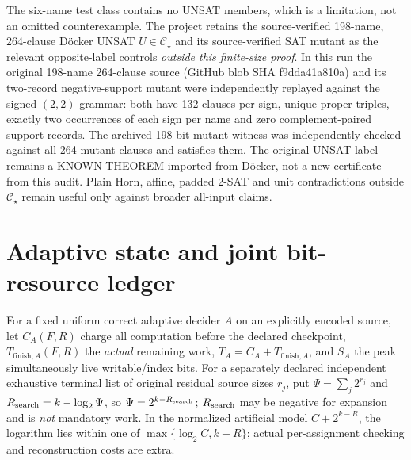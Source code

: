 \documentclass[11pt]{article}
\newcommand{\CS}{\mathcal C_\star}
\begin{document}
The six-name test class contains no UNSAT members, which is a limitation, not an omitted counterexample. The project retains the source-verified 198-name, 264-clause D\"ocker UNSAT $U\in\CS$ and its source-verified SAT mutant as the relevant opposite-label controls \emph{outside this finite-size proof}. In this run the original 198-name 264-clause source (GitHub blob SHA f9dda41a810a) and its two-record negative-support mutant were independently replayed against the signed $(2,2)$ grammar: both have 132 clauses per sign, unique proper triples, exactly two occurrences of each sign per name and zero complement-paired support records. The archived 198-bit mutant witness was independently checked against all 264 mutant clauses and satisfies them. The original UNSAT label remains a KNOWN THEOREM imported from D\"ocker, not a new certificate from this audit. Plain Horn, affine, padded 2-SAT and unit contradictions outside $\CS$ remain useful only against broader all-input claims.

\section{Adaptive state and joint bit-resource ledger}
For a fixed uniform correct adaptive decider $A$ on an explicitly encoded source, let $C_A(F,R)$ charge all computation before the declared checkpoint, $T_{\mathrm{finish},A}(F,R)$ the \emph{actual} remaining work, $T_A=C_A+T_{\mathrm{finish},A}$, and $S_A$ the peak simultaneously live writable/index bits. For a separately declared independent exhaustive terminal list of original residual source sizes $r_j$, put $\Psi=\sum_j2^{r_j}$ and $R_{\rm search}=k-\log_2\Psi$, so $\Psi=2^{k-R_{\rm search}}$; $R_{\rm search}$ may be negative for expansion and is \emph{not} mandatory work. In the normalized artificial model $C+2^{k-R}$, the logarithm lies within one of $\max\{\log_2 C,k-R\}$; actual per-assignment checking and reconstruction costs are extra.
\end{document}
